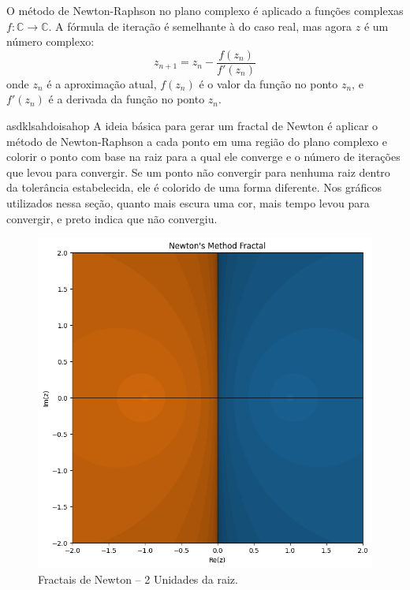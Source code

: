 O método de Newton-Raphson no plano complexo é aplicado a funções complexas \(f: \mathbb{C} \rightarrow \mathbb{C}\). A fórmula de iteração é semelhante à do caso real, mas agora \(z\) é um número complexo:
\begin{equation*}
    z_{n+1} = z_n - \frac{f(z_n)}{f'(z_n)}
\end{equation*}
onde \(z_n\) é a aproximação atual, \(f(z_n)\) é o valor da função no ponto \(z_n\), e \(f'(z_n)\) é a derivada da função no ponto \(z_n\).

asdklsahdoisahop
A ideia básica para gerar um fractal de Newton é aplicar o método de Newton-Raphson a cada ponto em uma região do plano complexo e colorir o ponto com base na raiz para a qual ele converge e o número de iterações que levou para convergir. Se um ponto não convergir para nenhuma raiz dentro da tolerância estabelecida, ele é colorido de uma forma diferente. Nos gráficos utilizados nessa seção, quanto mais escura uma cor, mais tempo levou para convergir, e preto indica que não convergiu.

\begin{figure}[H]
    \centering 
    \includegraphics[width=1\textwidth]{Imagens/nr2d_fractals/unit_roots/unitroot2.png}
    \caption{Fractais de Newton -- 2 Unidades da raiz.}
    \label{fig:fractaisnr_unitroots2}
\end{figure}


